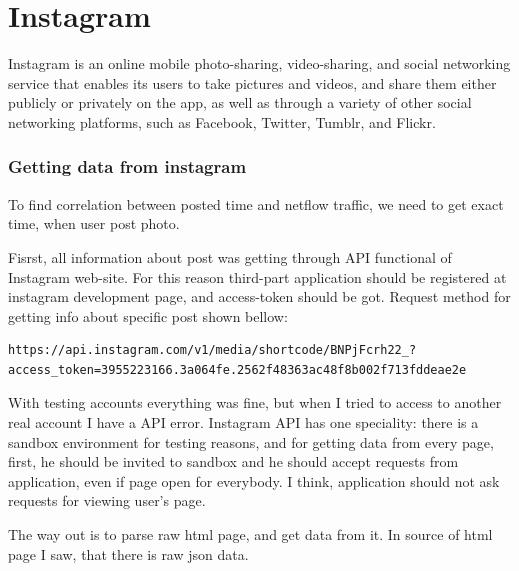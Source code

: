 \chapter{Instagram}

Instagram is an online mobile photo-sharing, video-sharing, and social networking service that enables its users to take pictures and videos, and share them either publicly or privately on the app, as well as through a variety of other social networking platforms, such as Facebook, Twitter, Tumblr, and Flickr. \cite{instagram1}

\subsection{Getting data from instagram}

To find correlation between posted time and netflow traffic, we need to get exact time, when user post photo.

Fisrst, all information about post was getting through API functional of Instagram web-site. For this reason third-part application should be registered at instagram development page, and access-token should be got. Request method for getting info about specific post shown bellow:

\begin{lstlisting}
https://api.instagram.com/v1/media/shortcode/BNPjFcrh22_?access_token=3955223166.3a064fe.2562f48363ac48f8b002f713fddeae2e
\end{lstlisting}

With testing accounts everything was fine, but when I tried to access to another real account I have a API error. Instagram API has one speciality: there is a sandbox environment for testing reasons, and for getting data from every page, first, he should be invited to sandbox and he should accept requests from application, even if page open for everybody. I think, application should not ask requests for viewing user's page. 

The way out is to parse raw html page, and get data from it. In source of html page I saw, that there is raw json data.

\begin{figure}[H]
\end{figure}

